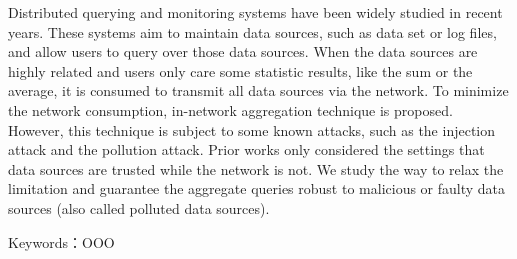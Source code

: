 Distributed querying and monitoring systems have been widely studied in recent years. These systems aim to maintain data sources, such as data set or log files, and allow users to query over those data sources. When the data sources are highly related and users only care some statistic results, like the sum or the average, it is consumed to transmit all data sources via the network. To minimize the network consumption, in-network aggregation technique is proposed. However, this technique is subject to some known attacks, such as the injection attack and the pollution attack. Prior works only considered the settings that data sources are trusted while the network is not. We study the way to relax the limitation and guarantee the aggregate queries robust to malicious or faulty data sources (also called polluted data sources). 

\vspace{1em}
\vspace{1em}
\vspace{1em}
\noindent Keywords：OOO